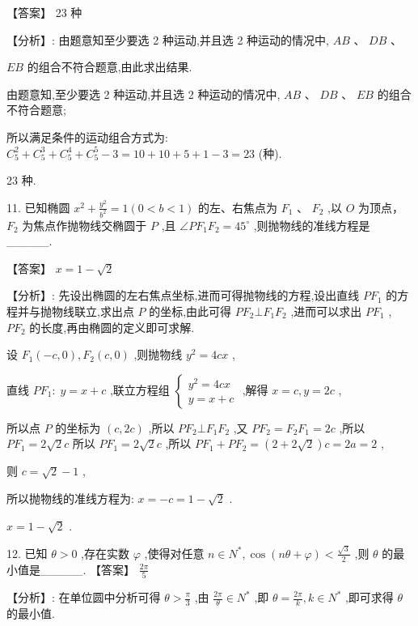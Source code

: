 \documentclass[10pt]{article}
\begin{document}
【答案】 23 种

【分析】: 由题意知至少要选 2 种运动,并且选 2 种运动的情况中, \({AB}\text{ 、 }{DB}\) 、

\({EB}\) 的组合不符合题意,由此求出结果.

由题意知,至少要选 2 种运动,并且选 2 种运动的情况中, \({AB}\text{ 、 }{DB}\text{ 、 }{EB}\) 的组合不符合题意;

所以满足条件的运动组合方式为: \({C}_{5}^{2} + {C}_{5}^{3} + {C}_{5}^{4} + {C}_{5}^{5} - 3 = {10} + {10} + 5 + 1 - 3 = {23}\) (种).

23 种.

11. 已知椭圆 \({x}^{2} + \frac{{y}^{2}}{{b}^{2}} = 1\left( {0 < b < 1}\right)\) 的左、右焦点为 \({F}_{1}\) 、 \({F}_{2}\) ,以 \(O\) 为顶点， \({F}_{2}\) 为焦点作抛物线交椭圆于 \(P\) ,且 \(\angle P{F}_{1}{F}_{2} = {45}^{ \circ  }\) ,则抛物线的准线方程是\_\_\_\_\_.

【答案】 \(x = 1 - \sqrt{2}\)

【分析】: 先设出椭圆的左右焦点坐标,进而可得抛物线的方程,设出直线 \(P{F}_{1}\) 的方程并与抛物线联立,求出点 \(P\) 的坐标,由此可得 \(P{F}_{2} \bot  {F}_{1}{F}_{2}\) ,进而可以求出 \(P{F}_{1}\) , \(P{F}_{2}\) 的长度,再由椭圆的定义即可求解.

设 \({F}_{1}\left( {-c,0}\right) ,{F}_{2}\left( {c,0}\right)\) ,则抛物线 \({y}^{2} = {4cx}\) ,

直线 \(P{F}_{1} : \;y = x + c\) ,联立方程组 \(\left\{  \begin{array}{l} {y}^{2} = {4cx} \\  y = x + c \end{array}\right.\) ,解得 \(x = c,y = {2c}\) ,

所以点 \(P\) 的坐标为 \(\left( {c,{2c}}\right)\) ,所以 \(P{F}_{2} \bot  {F}_{1}{F}_{2}\) ,又 \(P{F}_{2} = {F}_{2}{F}_{1} = {2c}\) ,所以 \(P{F}_{1} = 2\sqrt{2}c\) 所以 \(P{F}_{1} = 2\sqrt{2}c\) ,所以 \(P{F}_{1} + P{F}_{2} = \left( {2 + 2\sqrt{2}}\right) c = {2a} = 2\) ,

则 \(c = \sqrt{2} - 1\) ,

所以抛物线的准线方程为: \(x =  - c = 1 - \sqrt{2}\) .

\(x = 1 - \sqrt{2}\) .

12. 已知 \(\theta  > 0\) ,存在实数 \(\varphi\) ,使得对任意 \(n \in  {N}^{ * },\cos \left( {{n\theta } + \varphi }\right)  < \frac{\sqrt{3}}{2}\) ,则 \(\theta\) 的最小值是\_\_\_\_\_. 【答案】 \(\frac{2\pi }{5}\)

【分析】: 在单位圆中分析可得 \(\theta  > \frac{\pi }{3}\) ,由 \(\frac{2\pi }{\theta } \in  {N}^{ * }\) ,即 \(\theta  = \frac{2\pi }{k},k \in  {N}^{ * }\) ,即可求得 \(\theta\) 的最小值.
\end{document}
